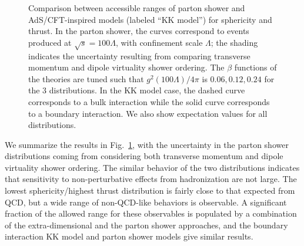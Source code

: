 \begin{enumerate}
\begin{figure}[tb!]
	\caption{Comparison between accessible ranges of parton shower and AdS/CFT-inspired models (labeled ``KK model'') for sphericity and thrust. In the parton shower, the curves correspond to events produced at $\sqrt{s} = 100\Lambda$, with confinement scale $\Lambda$; the shading indicates the uncertainty resulting from comparing transverse momentum and dipole virtuality shower ordering. The $\beta$ functions of the theories are tuned such that $g^2(100\Lambda)/4\pi$ is $0.06, 0.12, 0.24$ for the 3 distributions. In the KK model case, the dashed curve corresponds to a bulk interaction while the solid curve corresponds to a boundary interaction. We also show expectation values for all distributions.}
	\label{fig:compplots}
\end{figure}

We summarize the results in Fig.~\ref{fig:compplots}, with the uncertainty in the parton shower distributions coming from considering both transverse momentum and dipole virtuality shower ordering. The similar behavior of the two distributions indicates that sensitivity to non-perturbative effects from hadronization are not large.  The lowest sphericity/highest thrust distribution is fairly close to that expected from QCD, but a wide range of non-QCD-like behaviors is observable. A significant fraction of the allowed range for these observables is populated by a combination of the extra-dimensional and the parton shower approaches, and the boundary interaction KK model and parton shower models give similar results.


\end{enumerate}
